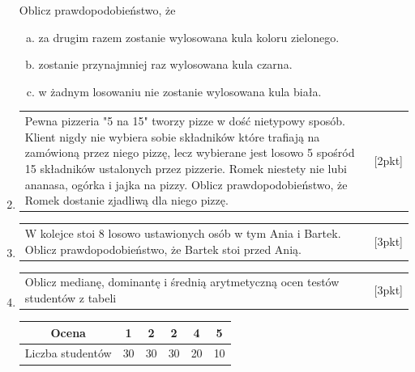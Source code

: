 \documentclass[12pt,a4paper]{article}
\begin{document}
\begin{enumerate}[1.]
		Oblicz prawdopodobieństwo, że
		
		\begin{enumerate}[a)]
			\item za drugim razem zostanie wylosowana kula koloru zielonego.
			\item zostanie przynajmniej raz wylosowana kula czarna.
			\item w żadnym losowaniu nie zostanie wylosowana kula biała.
		\end{enumerate}
		
		
		\item  \begin{tabular}{p{13cm} r}
			Pewna pizzeria "5 na 15" tworzy pizze w dość nietypowy sposób. Klient nigdy nie wybiera sobie składników które trafiają na zamówioną przez niego pizzę, lecz wybierane jest losowo 5 spośród 15 składników ustalonych przez pizzerie. Romek niestety nie lubi ananasa, ogórka i jajka na pizzy. Oblicz prawdopodobieństwo, że Romek dostanie zjadliwą dla niego pizzę.  &[2pkt]\\ 
		\end{tabular}
		
		\item  \begin{tabular}{p{13cm} r}
			W kolejce stoi 8 losowo ustawionych osób w tym Ania i Bartek. Oblicz prawdopodobieństwo, że Bartek stoi przed Anią.  &[3pkt]\\ 
		\end{tabular}
		
		\item  \begin{tabular}{p{13cm} r}
			Oblicz medianę, dominantę i średnią arytmetyczną ocen testów studentów z tabeli &[3pkt]\\ 
		\end{tabular}
		
		\begin{tabular}{|c|c|c|c|c|c|}
			\hline
			Ocena&1&2&2&4&5\\
			\hline
			Liczba studentów&30&30&30&20&10\\
			\hline
		\end{tabular}
		
	\end{enumerate}
	
\end{document}
